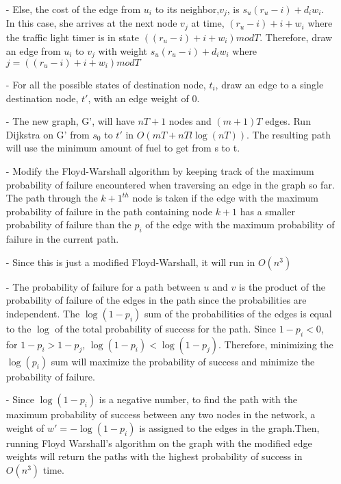 \documentclass[12pt,twoside]{article}
\begin{document}
\begin{problems}
\begin{itemize}
	\item [-]Else, the cost of the edge from $u_i$ to its neighbor,$v_j$,  is $s_u(r_u-i) + d_iw_i$. In this case, she arrives at the next node $v_j$ at time, $(r_u-i)+i+w_i$ where the traffic light timer is in state $((r_u-i)+i+w_i) mod T$. Therefore, draw an edge from $u_i$ to $v_j$ with weight $s_u(r_u-i) + d_iw_i$ where $j=((r_u-i)+i+w_i) mod T$ 
	\item[-] For all the possible states of destination node, $t_i$, draw an edge to a single destination node, $t'$, with an edge weight of 0.
	
	\item[-] The new graph, G', will have $nT + 1$ nodes and $(m+1)T$ edges. Run Dijkstra on G' from $s_0$ to $t'$  in $O(mT +nTl\log(nT))$. The resulting path will use the minimum amount of fuel to get from s to t.
\end{itemize}
\problem %

\begin{problemparts}
\problempart 
\begin{itemize}
	\item[-] Modify the Floyd-Warshall algorithm by keeping track of the maximum probability of failure encountered when traversing an edge in the graph so far. The path through the $k+1^{th}$ node is taken if the edge with the maximum probability of failure in the path containing node $k+1$ has a smaller probability of failure than the $p_i$ of the edge with the maximum probability of failure in the current path.
	\item[-] Since this is just a modified Floyd-Warshall, it will run in $O(n^3)$
\end{itemize}
\problempart 
\begin{itemize}
	\item[-] The probability of failure for a path between $u$ and $v$ is the product of the probability of failure of the edges in the path since the probabilities are independent. The $\log(1-p_i)$ sum of the probabilities of the edges is equal to the $\log$ of the total probability of success for the path. Since $1-p_i< 0$, for $1-p_i > 1-p_j$, $\log(1-p_i) <\log(1-p_j)$. Therefore, minimizing the $\log(p_i)$ sum will maximize the probability of success and minimize the probability of failure.
	 
	\item[-] Since $\log(1-p_i)$ is a negative number, to find the path with the maximum probability of success between any two nodes in the network, a weight of $w'= -\log(1-p_i)$ is assigned to the edges in the graph.Then, running Floyd Warshall's algorithm on the graph with the modified edge weights will return the paths with the highest probability of success in $O(n^3)$ time.
\end{itemize}
\end{problemparts}


\end{problems}
\end{document}

